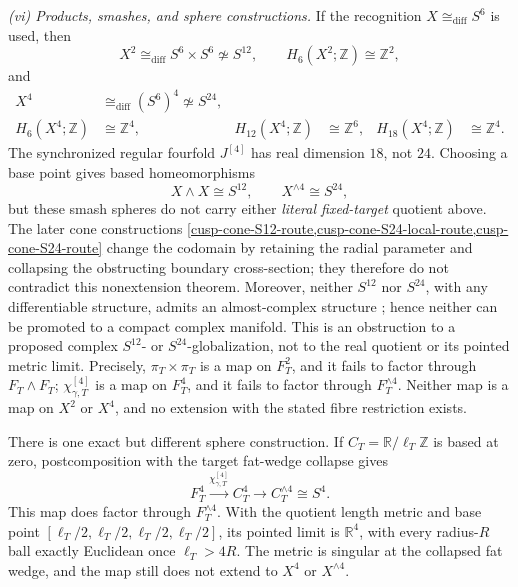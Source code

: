 \begin{theorem}
\smallskip
\noindent
\emph{(vi) Products, smashes, and sphere constructions.}
If the recognition \(X\cong_{\mathrm{diff}}S^6\) is used, then
\begin{equation}
 X^2\cong_{\mathrm{diff}}S^6\times S^6\not\simeq S^{12},\qquad
 H_6(X^2;\mathbb Z)\cong\mathbb Z^2,
 \label{cusp-spec-product-not-sphere}
\end{equation}
and
\begin{equation}
 \begin{aligned}
 X^4&\cong_{\mathrm{diff}}(S^6)^4\not\simeq S^{24},\\
 H_6(X^4;\mathbb Z)&\cong\mathbb Z^4,&
 H_{12}(X^4;\mathbb Z)&\cong\mathbb Z^6,&
 H_{18}(X^4;\mathbb Z)&\cong\mathbb Z^4.
 \end{aligned}
 \label{cusp-spec-four-product-not-sphere}
\end{equation}
The synchronized regular fourfold \(J^{[4]}\) has real dimension \(18\),
not \(24\).  Choosing a base point gives based homeomorphisms
\begin{equation}
X\wedge X\cong S^{12},\qquad X^{\wedge4}\cong S^{24},
\label{cusp-spec-smash-spheres}
\end{equation}
but these smash spheres do not carry either \emph{literal fixed-target}
quotient above.  The later cone constructions
\cref{cusp-cone-S12-route,cusp-cone-S24-local-route,cusp-cone-S24-route}
change the codomain by retaining the radial parameter and collapsing the
obstructing boundary cross-section; they therefore do not contradict this
nonextension theorem.  Moreover,
neither \(S^{12}\) nor \(S^{24}\), with any differentiable structure,
admits an almost-complex structure
\cite[\S15, Proposition~15.1 and the following remark,
p.~434]{BorelSerre1953}; hence neither can be promoted to a compact
complex manifold.  This is an obstruction to a proposed complex
\(S^{12}\)- or \(S^{24}\)-globalization, not to the real quotient or its
pointed metric limit.  Precisely,
\(\pi_T\times\pi_T\) is a map on \(F_T^2\), and it fails to factor
through \(F_T\wedge F_T\); \(\chi_{\gamma,T}^{[4]}\) is a map on
\(F_T^4\), and it fails to factor through \(F_T^{\wedge4}\).
Neither map is a map on \(X^2\) or \(X^4\), and no extension with the
stated fibre restriction exists.

There is one exact but different sphere construction.  If
\(C_T=\mathbb R/\ell_T\mathbb Z\) is based at zero, postcomposition with
the target fat-wedge collapse gives
\begin{equation}
 F_T^4\xrightarrow{\chi_{\gamma,T}^{[4]}}C_T^4
 \longrightarrow C_T^{\wedge4}\cong S^4.
 \label{cusp-spec-target-smash-map}
\end{equation}
This map does factor through \(F_T^{\wedge4}\).  With the quotient length
metric and base point
\([\ell_T/2,\ell_T/2,\ell_T/2,\ell_T/2]\), its pointed limit is
\(\mathbb R^4\), with every radius-\(R\) ball exactly Euclidean once
\(\ell_T>4R\).  The metric is singular at the collapsed fat wedge, and
the map still does not extend to \(X^4\) or \(X^{\wedge4}\).
\end{theorem}

